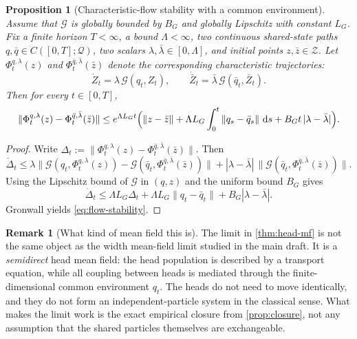 \documentclass{article}
\newtheorem{proposition}[theorem]{Proposition}
\theoremstyle{definition}
\newtheorem{remark}[theorem]{Remark}
\newcommand{\dd}{\,\mathrm{d}}
\begin{document}
\begin{proposition}[Characteristic-flow stability with a common environment]
\label{prop:flow-stability}
Assume that $\mathcal G$ is globally bounded by $B_G$ and globally Lipschitz with constant $L_G$. Fix a finite horizon $T<\infty$, a bound $\Lambda<\infty$, two continuous shared-state paths $q,\bar q\in C([0,T];\mathcal Q)$, two scalars $\lambda,\bar\lambda\in[0,\Lambda]$, and initial points $z,\bar z\in\mathcal Z$. Let $\Phi_t^{q,\lambda}(z)$ and $\Phi_t^{\bar q,\bar\lambda}(\bar z)$ denote the corresponding characteristic trajectories:
\[
  \dot Z_t=\lambda\,\mathcal G(q_t,Z_t),
  \qquad
  \dot{\bar Z}_t=\bar\lambda\,\mathcal G(\bar q_t,\bar Z_t).
\]
Then for every $t\in[0,T]$,
\begin{align}
  \|\Phi_t^{q,\lambda}(z)-\Phi_t^{\bar q,\bar\lambda}(\bar z)\|
  \le
  e^{\Lambda L_G t}
  \Bigl(
    \|z-\bar z\|
    +
    \Lambda L_G\int_0^t \|q_s-\bar q_s\|\,\dd s
    +
    B_G t\,|\lambda-\bar\lambda|
  \Bigr).
  \label{eq:flow-stability}
\end{align}
\end{proposition}

\begin{proof}
Write $\Delta_t:=\|\Phi_t^{q,\lambda}(z)-\Phi_t^{\bar q,\bar\lambda}(\bar z)\|$. Then
\[
  \dot \Delta_t
  \le
  \lambda
  \bigl\|
    \mathcal G(q_t,\Phi_t^{q,\lambda}(z))
    -
    \mathcal G(\bar q_t,\Phi_t^{\bar q,\bar\lambda}(\bar z))
  \bigr\|
  +
  |\lambda-\bar\lambda|\,
  \|\mathcal G(\bar q_t,\Phi_t^{\bar q,\bar\lambda}(\bar z))\|.
\]
Using the Lipschitz bound of $\mathcal G$ in $(q,z)$ and the uniform bound $B_G$ gives
\[
  \dot \Delta_t
  \le
  \Lambda L_G \Delta_t
  +
  \Lambda L_G \|q_t-\bar q_t\|
  +
  B_G |\lambda-\bar\lambda|.
\]
Gronwall yields \eqref{eq:flow-stability}.
\end{proof}

\begin{remark}[What kind of mean field this is]
\label{rem:semidirect}
The limit in \cref{thm:head-mf} is not the same object as the width mean-field limit studied in the main draft. It is a \emph{semidirect} head mean field: the head population is described by a transport equation, while all coupling between heads is mediated through the finite-dimensional common environment $q_t$. The heads do not need to move identically, and they do not form an independent-particle system in the classical sense. What makes the limit work is the exact empirical closure from \cref{prop:closure}, not any assumption that the shared particles themselves are exchangeable.
\end{remark}
\end{document}

